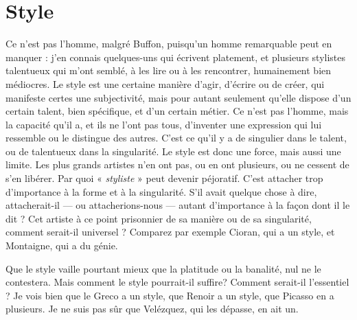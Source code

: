 \section{Style}
Ce n’est pas l’homme, malgré Buffon, puisqu’un homme remarquable
peut en manquer : j'en connais quelques-uns qui écrivent
platement, et plusieurs stylistes talentueux qui m'ont semblé, à les lire ou à
les rencontrer, humainement bien médiocres. Le style est une certaine
manière d’agir, d'écrire ou de créer, qui manifeste certes une subjectivité,
mais pour autant seulement qu’elle dispose d’un certain talent, bien spécifique,
et d’un certain métier. Ce n’est pas l’homme, mais la capacité qu’il a,
et ils ne l’ont pas tous, d’inventer une expression qui lui ressemble ou le distingue
des autres. C’est ce qu’il y a de singulier dans le talent, ou de talentueux
dans la singularité. Le style est donc une force, mais aussi une limite.
Les plus grands artistes n’en ont pas, ou en ont plusieurs, ou ne cessent de
s’en libérer. Par quoi « {\it styliste} » peut devenir péjoratif. C’est attacher trop
d'importance à la forme et à la singularité. S’il avait quelque chose à dire,
attacherait-il — ou attacherions-nous — autant d'importance à la façon dont il
le dit ? Cet artiste à ce point prisonnier de sa manière ou de sa singularité,
comment serait-il universel ? Comparez par exemple Cioran, qui a un style, et
Montaigne, qui a du génie.

Que le style vaille pourtant mieux que la platitude ou la banalité, nul ne le
contestera. Mais comment le style pourrait-il suffire? Comment serait-il
l'essentiel ? Je vois bien que le Greco a un style, que Renoir a un style, que Picasso
en a plusieurs. Je ne suis pas sûr que Velézquez, qui les dépasse, en ait un.

